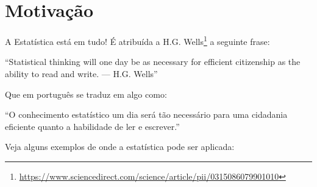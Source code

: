 \documentclass[12pt,]{style/krantz}
\renewenvironment{quote}{\begin{VF}}{\end{VF}}
\renewcommand{\href}[2]{#2\footnote{\url{#1}}}
\theoremstyle{definition}
\theoremstyle{definition}
\theoremstyle{definition}
\theoremstyle{remark}
\begin{document}
\hypertarget{motivacao}{%
\section*{Motivação}\label{motivacao}}


A Estatística está em tudo! É atribuída a \href{https://www.sciencedirect.com/science/article/pii/0315086079901010}{H.G. Wells} a seguinte frase:

\begin{quote}
``Statistical thinking will one day be as necessary for efficient citizenship as the ability to read and write. --- H.G. Wells''
\end{quote}

Que em português se traduz em algo como:

\begin{quote}
``O conhecimento estatístico um dia será tão necessário para uma cidadania eficiente quanto a habilidade de ler e escrever.''
\end{quote}

Veja alguns exemplos de onde a estatística pode ser aplicada:
\end{document}
